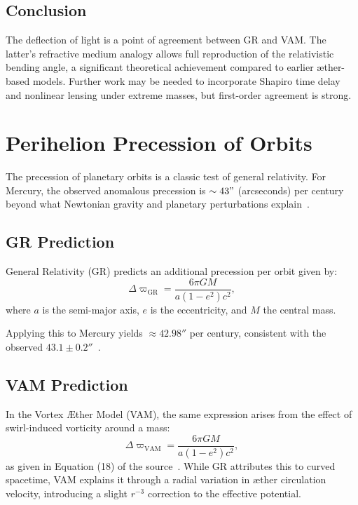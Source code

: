 \documentclass[a4paper, aps,preprint,superscriptaddress, 12pt]{revtex4}
\begin{document}
\subsection*{Conclusion}
The deflection of light is a point of agreement between GR and VAM. The latter's refractive medium analogy allows full reproduction of the relativistic bending angle, a significant theoretical achievement compared to earlier æther-based models. Further work may be needed to incorporate Shapiro time delay and nonlinear lensing under extreme masses, but first-order agreement is strong.
\section{Perihelion Precession of Orbits}

The precession of planetary orbits is a classic test of general relativity. For Mercury, the observed anomalous precession is $\sim 43"$ (arcseconds) per century beyond what Newtonian gravity and planetary perturbations explain~\cite{will2014confrontation}.

\subsection*{GR Prediction}
General Relativity (GR) predicts an additional precession per orbit given by:
\begin{equation}
    \Delta \varpi_\text{GR} = \frac{6\pi GM}{a(1-e^2)c^2},
\end{equation}
where $a$ is the semi-major axis, $e$ is the eccentricity, and $M$ the central mass.

Applying this to Mercury yields $\approx 42.98''$ per century, consistent with the observed $43.1 \pm 0.2''$~\cite{sereno2006solar}.

\subsection*{VAM Prediction}
In the Vortex Æther Model (VAM), the same expression arises from the effect of swirl-induced vorticity around a mass:
\begin{equation}
    \Delta \varpi_\text{VAM} = \frac{6\pi GM}{a(1-e^2)c^2},
\end{equation}
as given in Equation (18) of the source~\cite{iskandarani2025VAM2}. While GR attributes this to curved spacetime, VAM explains it through a radial variation in æther circulation velocity, introducing a slight $r^{-3}$ correction to the effective potential.
\end{document}
